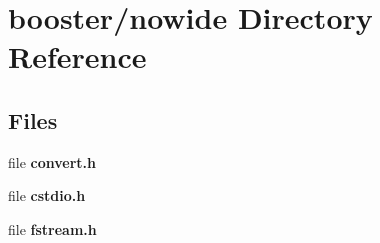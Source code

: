\section{booster/nowide Directory Reference}
\label{dir_cc56e8e31021b236a9882130c9796a41}
\subsection*{Files}
\begin{DoxyCompactItemize}
\item 
file {\bfseries convert.\-h}
\item 
file {\bfseries cstdio.\-h}
\item 
file {\bfseries fstream.\-h}
\end{DoxyCompactItemize}
